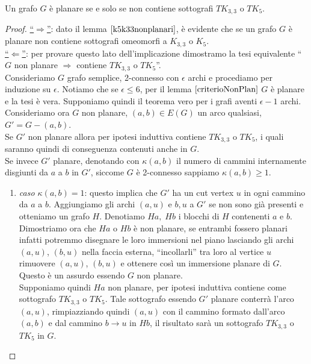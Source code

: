 \begin{teorema}\label{Kuratowski}
    Un grafo \(G\) è planare se e solo se non contiene sottografi \(TK_{3,3}\) o \(TK_5\).
    \begin{proof}
        \underline{“\(\Rightarrow\)”}: dato il lemma \(\ref{k5k33nonplanari}\), è evidente che se un grafo \(G\) è planare non contiene sottografi omeomorfi a \(K_{3,3}\) o \(K_5\). \smallskip \\
        \underline{“\(\Leftarrow\)”}: per provare questo lato dell'implicazione dimostramo la tesi equivalente “\(G\) non planare \(\Rightarrow\) contiene \(TK_{3,3}\) o \(TK_5\)”.\\
        Consideriamo \(G\) grafo semplice, 2-connesso con \(\epsilon\) archi e procediamo per induzione su \(\epsilon\). Notiamo che se \(\epsilon \leq 6\), per il lemma \(\ref{criterioNonPlan}\) \(G\) è planare e la tesi è vera. Supponiamo quindi il teorema vero per i grafi aventi \(\epsilon-1\) archi.\\
        Consideriamo ora \(G\) non planare, \((a,b) \in E(G)\) un arco qualsiasi, \(G'=G-(a,b)\). \\
        Se \(G'\) non planare allora per ipotesi induttiva contiene \(TK_{3,3}\) o \(TK_5\), i quali saranno quindi di conseguenza contenuti anche in \(G\). \\
        Se invece \(G'\) planare, denotando con \(\kappa(a,b)\) il numero di cammini internamente disgiunti da \(a\) a \(b\) in \(G'\), siccome \(G\) è 2-connesso sappiamo \(\kappa(a,b)\geq 1\).
        \begin{enumerate}
            \item \textit{caso \(\kappa(a,b)=1\)}: questo implica che \(G'\) ha un cut vertex \(u\) in ogni cammino da \(a\) a \(b\). Aggiungiamo gli archi \((a,u)\) e \(b,u\) a \(G'\) se non sono già presenti e otteniamo un grafo \(H\). Denotiamo \(Ha,\; Hb\) i blocchi di \(H\) contenenti \(a\) e \(b\).
            \\ Dimostriamo ora che \(Ha\) o \(Hb\) è non planare, se entrambi fossero planari infatti potremmo disegnare le loro immersioni nel piano lasciando gli archi \((a,u)\), \((b,u)\) nella faccia esterna, “incollarli” tra loro al vertice \(u\) rimuovere  \((a,u)\), \((b,u)\) e ottenere così un immersione planare di \(G\). Questo è un assurdo essendo \(G\) non planare.\\
            Supponiamo quindi \(Ha\) non planare, per ipotesi induttiva contiene come sottografo \(TK_{3,3}\) o \(TK_5\). Tale sottografo essendo \(G'\) planare conterrà l'arco \((a,u)\), rimpiazziando quindi \((a,u)\) con il cammino formato dall'arco \((a,b)\) e dal cammino \(b \to u\) in \(Hb\), il risultato sarà un sottografo \(TK_{3,3}\) o \(TK_5\) in \(G\).

\end{enumerate}
\end{proof}
\end{teorema}
